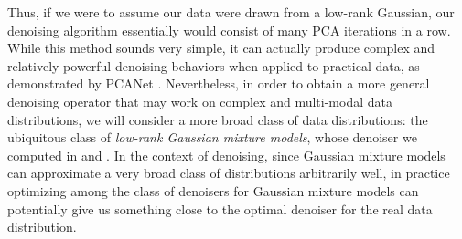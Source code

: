 \documentclass[../../book-main.tex]{subfiles}
\begin{document}
Thus, if we were to assume our data were drawn from a low-rank Gaussian, our denoising algorithm essentially would consist of many PCA iterations in a row. While this method sounds very simple, it can actually produce complex and relatively powerful denoising behaviors when applied to practical data, as demonstrated by PCANet \parencite{chan2015pcanet}. Nevertheless, in order to obtain a more general denoising operator that may work on complex and multi-modal data distributions, we will consider a more broad class of data distributions: the ubiquitous class of \textit{low-rank Gaussian mixture models},  whose denoiser we computed in  and . In the context of denoising, since Gaussian mixture models can approximate a very broad class of distributions arbitrarily well, in practice optimizing among the class of denoisers for Gaussian mixture models can potentially give us something close to the optimal denoiser for the real data distribution. 
\end{document}
